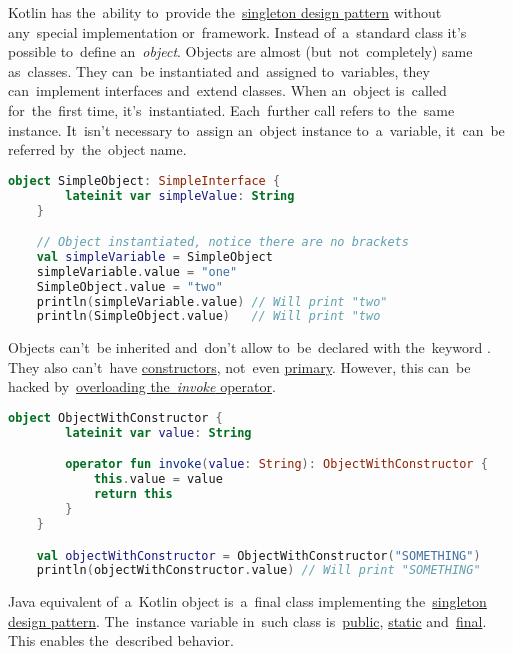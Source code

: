 \label{kotlinobject}
Kotlin has the~ability to~provide the~\hyperref[singletondp]{singleton design pattern} without any~special implementation or~framework.
Instead of~a~standard class it's possible to~define an~\textit{object}.
Objects are almost (but~not~completely) same as~classes.
They can~be instantiated and~assigned to~variables, they can~implement interfaces and~extend classes.
When an~object is~called for~the~first time, it's~instantiated.
Each~further call refers to~the~same instance.
It~isn't necessary to~assign an~object instance to~a~variable, it~can~be referred by~the~object name.

\begin{lstlisting}[language=Kotlin]
    object SimpleObject: SimpleInterface {
        lateinit var simpleValue: String
    }

    // Object instantiated, notice there are no brackets
    val simpleVariable = SimpleObject
    simpleVariable.value = "one"
    SimpleObject.value = "two"
    println(simpleVariable.value) // Will print "two"
    println(SimpleObject.value)   // Will print "two
\end{lstlisting}
\newline

\noindent Objects can't~be inherited and~don't allow to~be~declared with the~keyword .
They also can't~have \hyperref[kotlinconstructor]{constructors}, not~even \hyperref[kotlinprimaryconstructor]{primary}.
However, this can~be hacked by~\hyperref[kotlininvokeoverload]{overloading \mbox{the \textit{invoke}} operator}.

\begin{lstlisting}[language=Kotlin]
    object ObjectWithConstructor {
        lateinit var value: String

        operator fun invoke(value: String): ObjectWithConstructor {
            this.value = value
            return this
        }
    }

    val objectWithConstructor = ObjectWithConstructor("SOMETHING")
    println(objectWithConstructor.value) // Will print "SOMETHING"
\end{lstlisting}
\newline

\noindent Java equivalent of~a~Kotlin object is~a~final class implementing the~\hyperref[singletondp]{singleton design pattern}.
The~instance variable in~such class is~\hyperref[javapublic]{public}, \hyperref[javastatic]{static} and~\hyperref[javafinal]{final}.
This enables the~described behavior.
\newpage

